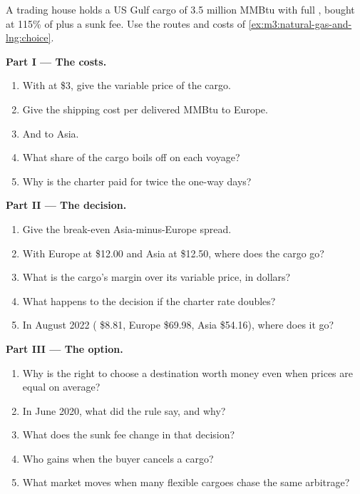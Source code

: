 \begin{problem}\label{pb:m3:natural-gas-and-lng:1}
A trading house holds a US Gulf cargo of 3.5 million MMBtu with full , bought at 115\% of  plus a sunk fee. Use the routes and costs of
\cref{ex:m3:natural-gas-and-lng:choice}.

\medskip\noindent\textbf{Part I --- The costs.}
\begin{enumerate}
\item With  at \$3, give the variable price of the cargo.
\item Give the shipping cost per delivered MMBtu to Europe.
\item And to Asia.
\item What share of the cargo boils off on each voyage?
\item Why is the charter paid for twice the one-way days?
\end{enumerate}

\medskip\noindent\textbf{Part II --- The decision.}
\begin{enumerate}[resume]
\item Give the break-even Asia-minus-Europe spread.
\item With Europe at \$12.00 and Asia at \$12.50, where does the cargo go?
\item What is the cargo's margin over its variable price, in dollars?
\item What happens to the decision if the charter rate doubles?
\item In August 2022 ( \$8.81, Europe \$69.98, Asia \$54.16), where does it go?
\end{enumerate}

\medskip\noindent\textbf{Part III --- The option.}
\begin{enumerate}[resume]
\item Why is the right to choose a destination worth money even when prices are equal on
average?
\item In June 2020, what did the  rule say, and why?
\item What does the sunk fee change in that decision?
\item Who gains when the buyer cancels a cargo?
\item What market moves when many flexible cargoes chase the same arbitrage?
\end{enumerate}


\end{problem}
